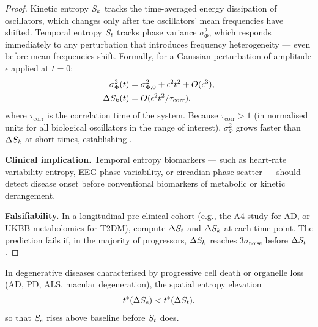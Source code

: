 \begin{proof}
Kinetic entropy $S_k$ tracks the time-averaged energy dissipation of
oscillators, which changes only after the oscillators' mean frequencies have
shifted.  Temporal entropy $S_t$ tracks phase variance $\sigma_\Phi^2$, which
responds immediately to any perturbation that introduces frequency
heterogeneity — even before mean frequencies shift.  Formally, for a Gaussian
perturbation of amplitude $\epsilon$ applied at $t = 0$:
\begin{align}
  \sigma_\Phi^2(t) &= \sigma_{\Phi,0}^2 + \epsilon^2 t^2 + O(\epsilon^3),
    \label{eq:ch07-sigma-growth} \\
  \Delta S_k(t)     &= O(\epsilon^2 t^2 / \tau_{\mathrm{corr}}),
    \label{eq:ch07-Sk-growth}
\end{align}
where $\tau_{\mathrm{corr}}$ is the correlation time of the system.  Because
$\tau_{\mathrm{corr}} > 1$ (in normalised units for all biological oscillators
in the range of interest), $\sigma_\Phi^2$ grows faster than $\Delta S_k$ at
short times, establishing .

\textbf{Clinical implication.}  Temporal entropy biomarkers — such as
heart-rate variability entropy, EEG phase variability, or circadian phase
scatter — should detect disease onset before conventional biomarkers of
metabolic or kinetic derangement.

\textbf{Falsifiability.}  In a longitudinal pre-clinical cohort (e.g., the
A4 study for AD, or UKBB metabolomics for T2DM), compute $\Delta S_t$ and
$\Delta S_k$ at each time point.  The prediction fails if, in the majority of
progressors, $\Delta S_k$ reaches $3\sigma_{\mathrm{noise}}$ before $\Delta S_t$.
\end{proof}

\begin{theorem}
\label{thm:ch07-P8}
In degenerative diseases characterised by progressive cell death or organelle
loss (AD, PD, ALS, macular degeneration), the spatial entropy elevation
\begin{equation}
  t^{*}(\Delta S_e) < t^{*}(\Delta S_t),
  \label{eq:ch07-P8-spatial}
\end{equation}
so that $S_e$ rises above baseline before $S_t$ does.
\end{theorem}

